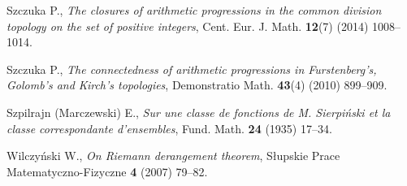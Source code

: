 \documentclass{amsart}
\theoremstyle{definition}
\theoremstyle{definition}
\begin{document}
\begin{thebibliography}{abc}
Szczuka P., \emph{The closures of arithmetic progressions in the common division topology on the set of positive integers},
Cent. Eur. J. Math. {\bf 12}(7) (2014) 1008--1014.

Szczuka P., \emph{The connectedness of arithmetic progressions in Furstenberg's, Golomb's and Kirch's topologies},
Demonstratio Math. {\bf 43}(4) (2010) 899--909.

Szpilrajn (Marczewski) E., \emph{Sur une classe de fonctions de M. Sierpiński et la classe correspondante d'ensembles},
Fund. Math. {\bf 24} (1935) 17--34.

Wilczyński W., \emph{On Riemann derangement theorem},
Słupskie Prace Matematyczno-Fizyczne {\bf 4} (2007) 79--82.

\end{thebibliography}
\end{document}
